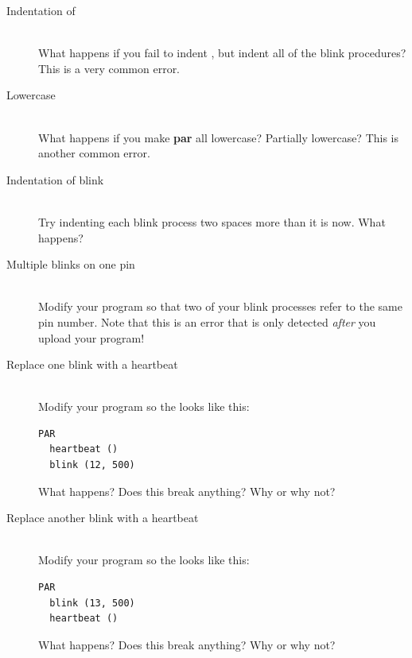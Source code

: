 \begin{description}
		\item[Indentation of \PAR]\ \\
	What happens if you fail to indent \PAR, but indent all of the {\procname blink} procedures? This is a very common error.
		\item[Lowercase \PAR]\ \\
	What happens if you make {\bfseries par} all lowercase? Partially lowercase? This is another common error.
	\item[Indentation of {\procname blink}]\ \\
	Try indenting each {\procname blink} process two spaces more than it is now. What happens?
	\item[Multiple {\procname blink}s on one pin]\ \\
	Modify your program so that two of your {\procname blink} processes refer to the same pin number. Note that this is an error that is only detected {\em after} you upload your program!
	\item[Replace one {\procname blink} with a {\procname heartbeat}]\ \\
	Modify your program so the \PAR looks like this:
	\begin{lstlisting}[firstnumber=2]
PAR
  heartbeat ()
  blink (12, 500)
	\end{lstlisting}
	What happens? Does this break anything? Why or why not?
	\item[Replace another {\procname blink} with a {\procname heartbeat}]\ \\
	Modify your program so the \PAR looks like this:
	\begin{lstlisting}[firstnumber=2]
PAR
  blink (13, 500)
  heartbeat ()
	\end{lstlisting}
	What happens? Does this break anything? Why or why not?
\end{description}
	
